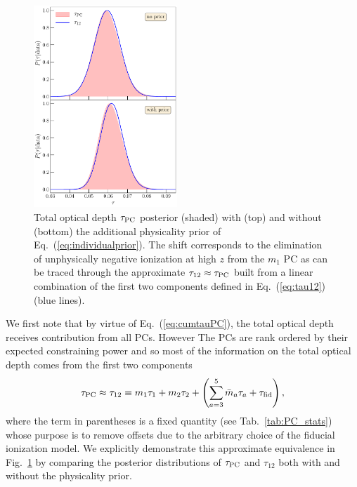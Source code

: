 \documentclass[prd,twocolumn,amsmath,amssymb,floatfix,superscriptaddress,nofootinbib]{revtex4-1}
\newcommand{\beq}{\begin{equation}}
\newcommand{\eeq}{\end{equation}}
\begin{document}
\begin{figure}[ht]
\includegraphics[width=0.48\textwidth]{paper/plots/plot_tau12_new_apply_cut_False_vs_True_pl18_pc_zmax30_pliklite_srollv2_1015_two_panels.pdf}
\caption{Total optical depth $\tau_{\rm PC}$ posterior (shaded) with (top) and without (bottom) the additional physicality prior of Eq.~(\ref{eq:individualprior}).  The shift corresponds to the elimination of unphysically negative ionization at high $z$ from the $m_1$ PC as can be traced through the approximate $\tau_{12} \approx \tau_{\rm PC}$ built from a linear combination of the first two components defined in Eq.~(\ref{eq:tau12}) (blue lines).  }
\label{fig:tau12}
\end{figure}


 We first note that by virtue of Eq.~(\ref{eq:cumtauPC}), the total optical depth receives contribution from all PCs.  However
The PCs are rank ordered by their expected constraining power and so most of the information on the total optical depth comes from
the first two components
\beq
\tau_{\rm PC} \approx \tau_{12} \equiv  m_1 \tau_1 + m_2 \tau_2 +
\left(\sum_{a=3}^5 \bar m_a \tau_a + \tau_{\rm fid}\right) ,
\label{eq:tau12}
\eeq
where the term in parentheses is a fixed quantity (see Tab.~\ref{tab:PC_stats}) whose purpose is to remove offsets due to the arbitrary choice of the fiducial ionization model.  We explicitly demonstrate this approximate equivalence in Fig.~\ref{fig:tau12} by comparing the
posterior distributions of $\tau_{\rm PC}$ and $\tau_{12}$ both with and without the physicality prior.  
\end{document}
